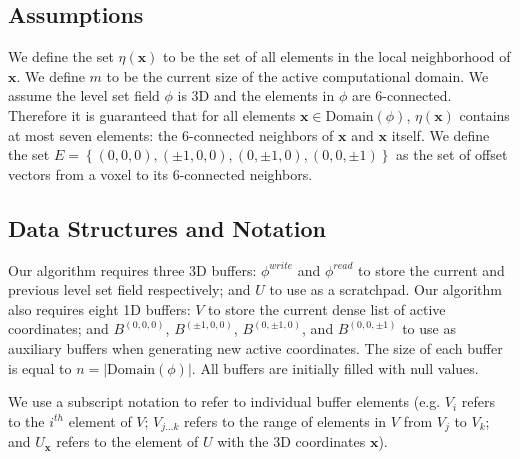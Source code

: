 \documentclass[annualconference]{acmsiggraph}  %
\newcommand{\leftbracket}{\left(}
\newcommand{\rightbracket}{\right)}
\newcommand{\leftcbracket}{\left\{}
\newcommand{\rightcbracket}{\right\}}
\newcommand{\leftvbracket}{\left|}
\newcommand{\rightvbracket}{\right|}
\newcommand{\boldx}{{\mathbf x}}
\newcommand{\nx}{ \eta \leftbracket \boldx \rightbracket }
\newcommand{\phiread}{ \phi^{read} }
\newcommand{\phiwrite}{ \phi^{write} }
\newcommand{\domainphi}{ \mbox{Domain} \leftbracket \phi \rightbracket }
\begin{document}
\subsection{Assumptions}
\label{subsec:assumptions}

We define the set $ \nx $ to be the set of all elements in the local neighborhood of $\boldx$. We define $m$ to be the current size of the active computational domain. We assume the level set field $ \phi $ is 3D and the elements in $ \phi $ are 6-connected. Therefore it is guaranteed that for all elements $ \boldx \in \domainphi $, $ \nx $ contains at most seven elements: the 6-connected neighbors of $ \boldx $ and $ \boldx $ itself. We define the set $ E = \leftcbracket \leftbracket 0,0,0 \rightbracket , \leftbracket \pm 1,0,0 \rightbracket , \leftbracket 0,\pm 1,0 \rightbracket , \leftbracket 0,0,\pm 1 \rightbracket \rightcbracket $ as the set of offset vectors from a voxel to its 6-connected neighbors.


\subsection{Data Structures and Notation}
\label{subsec:dataStructuresAndNotation}

Our algorithm requires three 3D buffers: $\phiwrite$ and $\phiread$ to store the current and previous level set field respectively; and $U$ to use as a scratchpad. Our algorithm also requires eight 1D buffers: $V$ to store the current dense list of active coordinates; and $B^{ \leftbracket 0,0,0 \rightbracket }$, $B^{ \leftbracket \pm 1,0,0 \rightbracket }$, $B^{ \leftbracket 0, \pm 1,0 \rightbracket }$, and $B^{ \leftbracket 0,0, \pm 1 \rightbracket }$ to use as auxiliary buffers when generating new active coordinates. The size of each buffer is equal to $n = \leftvbracket \mbox{Domain} \leftbracket \phi \rightbracket \rightvbracket$. All buffers are initially filled with null values.

We use a subscript notation to refer to individual buffer elements (e.g. $V_i$ refers to the $i^{th}$ element of $V$; $V_{j \ldots k }$ refers to the range of elements in $V$ from $V_j$ to $V_k$; and $U_{\boldx}$ refers to the element of $U$ with the 3D coordinates $\boldx$).

\end{document}
